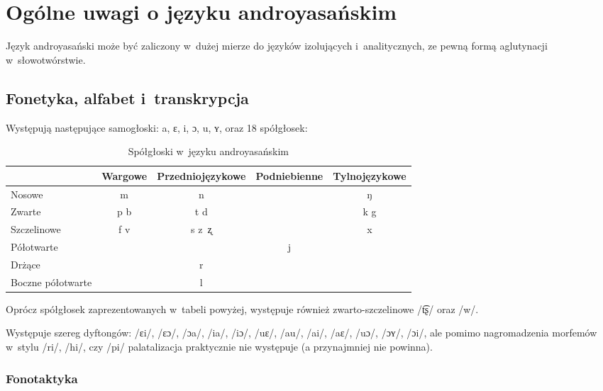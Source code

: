 \section[Ogólne uwagi]{Ogólne uwagi o języku androyasańskim}

\begin{spacing}{1.1}
Język androyasański może być zaliczony w~dużej mierze do języków 
izolujących i~analitycznych, ze pewną formą aglutynacji w~słowotwórstwie.

\subsection{Fonetyka, alfabet i~transkrypcja}

Występują następujące samogłoski: a, ɛ, i, ɔ, u, ʏ, oraz 18 spółgłosek:

\begin{table}[ht]
\centering
\caption{Spółgłoski w~języku androyasańskim}
\begin{tabular}{lcccc}\toprule
                  & Wargowe & Przedniojęzykowe & Podniebienne & Tylnojęzykowe \\\midrule
Nosowe            & m       & n                &              & ŋ             \\\midrule
Zwarte            & p b     & t d              &              & k g           \\\midrule
Szczelinowe       & f v     & s z~ʐ            &              & x             \\\midrule
Półotwarte        &         &                  & j            &               \\\midrule
Drżące            &         & r                &              &               \\\midrule
Boczne półotwarte &         & l                &              &               \\\bottomrule
\end{tabular}
\label{tab:consonants}
\end{table}

Oprócz spółgłosek zaprezentowanych w~tabeli powyżej, występuje 
również zwarto-szczelinowe /t͡ʂ/ oraz /w/.

Występuje szereg dyftongów: /ɛi/, /ɛɔ/, /ɔa/, /ia/, /iɔ/, /uɛ/, /au/, /ai/, 
/aɛ/, /uɔ/, /ɔʏ/, /ɔi/, ale pomimo nagromadzenia morfemów w~stylu /ri/, /hi/, 
czy /pi/ palatalizacja praktycznie nie występuje (a przynajmniej nie powinna).

\subsubsection{Fonotaktyka}


\end{spacing}
